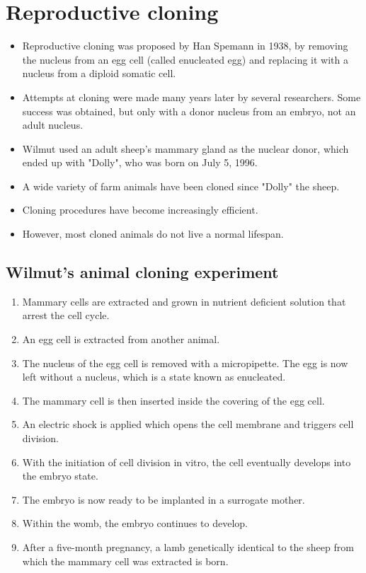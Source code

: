 \documentclass[11pt]{article}
\begin{document}
\section{Reproductive cloning}
\label{sec:orgcf98064}
\begin{itemize}
\item Reproductive cloning was proposed by Han Spemann in 1938, by removing the nucleus from an egg cell (called enucleated egg) and replacing it with a nucleus from a diploid somatic cell.
\item Attempts at cloning were made many years later by several researchers. Some success was obtained, but only with a donor nucleus from an embryo, not an adult nucleus.
\item Wilmut used an adult sheep's mammary gland as the nuclear donor, which ended up with "Dolly", who was born on July 5, 1996.
\item A wide variety of farm animals have been cloned since "Dolly" the sheep.
\item Cloning procedures have become increasingly efficient.
\item However, most cloned animals do not live a normal lifespan.
\end{itemize}

\subsection{Wilmut's animal cloning experiment}
\label{sec:orgde314e1}
\begin{enumerate}
\item Mammary cells are extracted and grown in nutrient deficient solution that arrest the cell cycle.
\item An egg cell is extracted from another animal.
\item The nucleus of the egg cell is removed with a micropipette. The egg is now left without a nucleus, which is a state known as enucleated.
\item The mammary cell is then inserted inside the covering of the egg cell.
\item An electric shock is applied which opens the cell membrane and triggers cell division.
\item With the initiation of cell division in vitro, the cell eventually develops into the embryo state.
\item The embryo is now ready to be implanted in a surrogate mother.
\item Within the womb, the embryo continues to develop.
\item After a five-month pregnancy, a lamb genetically identical to the sheep from which the mammary cell was extracted is born.
\end{enumerate}
\end{document}
